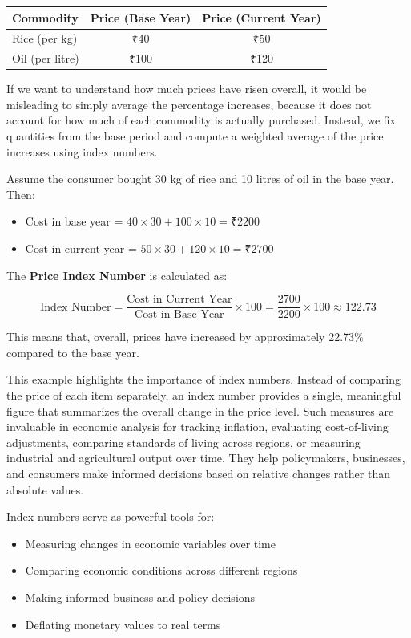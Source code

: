 \documentclass[twoside]{book}
\begin{document}
\begin{table}[H]
\centering
\begin{tabular}{l|c|c}
\toprule
\textbf{Commodity} & \textbf{Price (Base Year)} & \textbf{Price (Current Year)} \\
\midrule
Rice (per kg) & ₹40 & ₹50 \\
Oil (per litre) & ₹100 & ₹120 \\
\bottomrule
\end{tabular}
\end{table}

If we want to understand how much prices have risen overall, it would be misleading to simply average the percentage increases, because it does not account for how much of each commodity is actually purchased. Instead, we fix quantities from the base period and compute a weighted average of the price increases using index numbers.

Assume the consumer bought 30 kg of rice and 10 litres of oil in the base year. Then:

\begin{itemize}
    \item Cost in base year = \( 40 \times 30 + 100 \times 10 = ₹2200 \)
    \item Cost in current year = \( 50 \times 30 + 120 \times 10 = ₹2700 \)
\end{itemize}

The \textbf{Price Index Number} is calculated as:

\[
\text{Index Number} = \frac{\text{Cost in Current Year}}{\text{Cost in Base Year}} \times 100 = \frac{2700}{2200} \times 100 \approx 122.73
\]

This means that, overall, prices have increased by approximately 22.73\% compared to the base year.

This example highlights the importance of index numbers. Instead of comparing the price of each item separately, an index number provides a single, meaningful figure that summarizes the overall change in the price level. Such measures are invaluable in economic analysis for tracking inflation, evaluating cost-of-living adjustments, comparing standards of living across regions, or measuring industrial and agricultural output over time. They help policymakers, businesses, and consumers make informed decisions based on relative changes rather than absolute values.

Index numbers serve as powerful tools for:
\begin{itemize}
    \item Measuring changes in economic variables over time
    \item Comparing economic conditions across different regions
    \item Making informed business and policy decisions
    \item Deflating monetary values to real terms
\end{itemize}
\end{document}
